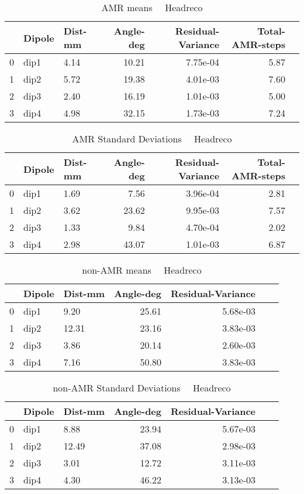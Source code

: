 \documentclass{article}
\begin{document}
\begin{table}
\begin{tabular}{lllrrrr}
\toprule
& Dipole& Dist-mm& Angle-deg& Residual-Variance& Total-AMR-steps\\
\midrule
0 & dip1 & 4.14 & 10.21 & 7.75e-04 & 5.87\\
1 & dip2 & 5.72 & 19.38 & 4.01e-03 & 7.60\\
2 & dip3 & 2.40 & 16.19 & 1.01e-03 & 5.00\\
3 & dip4 & 4.98 & 32.15 & 1.73e-03 & 7.24\\
\end{tabular}
\caption{AMR means \ \textemdash \ Headreco}
\end{table}
\begin{table}
\begin{tabular}{lllrrrr}
\toprule
& Dipole& Dist-mm& Angle-deg& Residual-Variance& Total-AMR-steps\\
\midrule
0 & dip1 & 1.69 & 7.56 & 3.96e-04 & 2.81\\
1 & dip2 & 3.62 & 23.62 & 9.95e-03 & 7.57\\
2 & dip3 & 1.33 & 9.84 & 4.70e-04 & 2.02\\
3 & dip4 & 2.98 & 43.07 & 1.01e-03 & 6.87\\
\end{tabular}
\caption{AMR Standard Deviations \ \textemdash \ Headreco}
\end{table}
\begin{table}
\begin{tabular}{lllrrrr}
\toprule
& Dipole& Dist-mm& Angle-deg& Residual-Variance\\
\midrule
0 & dip1 & 9.20 & 25.61 & 5.68e-03\\
1 & dip2 & 12.31 & 23.16 & 3.83e-03\\
2 & dip3 & 3.86 & 20.14 & 2.60e-03\\
3 & dip4 & 7.16 & 50.80 & 3.83e-03\\
\end{tabular}
\caption{non-AMR means \ \textemdash \ Headreco}
\end{table}
\begin{table}
\begin{tabular}{lllrrrr}
\toprule
& Dipole& Dist-mm& Angle-deg& Residual-Variance\\
\midrule
0 & dip1 & 8.88 & 23.94 & 5.67e-03\\
1 & dip2 & 12.49 & 37.08 & 2.98e-03\\
2 & dip3 & 3.01 & 12.72 & 3.11e-03\\
3 & dip4 & 4.30 & 46.22 & 3.13e-03\\
\end{tabular}
\caption{non-AMR Standard Deviations \ \textemdash \ Headreco}
\end{table}
\end{document}
